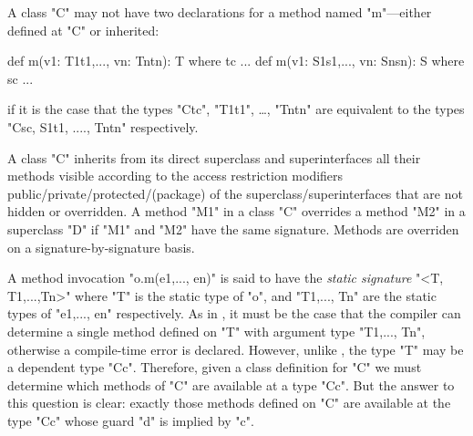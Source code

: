 \begin{staticrule*}
  A class \xcd"C" may not have two declarations for a method named \xcd"m"---either
  defined at \xcd"C" or inherited:
\begin{xten}
def m(v1: T1{t1},..., vn: Tn{tn}): T where tc {...}
def m(v1: S1{s1},..., vn: Sn{sn}): S where sc {...}
\end{xten}
\noindent
if it is the case that the types \xcd"C{tc}", \xcd"T1{t1}",
\dots, \xcd"Tn{tn}" are
equivalent to the types \xcd"C{sc}, S1{t1}, ...., Tn{tn}"
respectively.
\end{staticrule*}

A class \xcd"C" inherits from its direct superclass and superinterfaces all
their methods visible according to the access restriction modifiers
public/private/protected/(package) of the superclass/superinterfaces
that are not hidden or overridden. A method \xcd"M1" in a class \xcd"C" overrides
a method \xcd"M2" in a superclass \xcd"D" if \xcd"M1" and \xcd"M2" have the same signature.
Methods are overriden on a signature-by-signature basis.

A method invocation \xcd"o.m(e1,..., en)" is said to have the {\em static
signature} \xcd"<T, T1,...,Tn>" where \xcd"T" is the static type of \xcd"o", and
\xcd"T1,..., Tn" are the static types of \xcd"e1,..., en" respectively.  As in
\Java, it must be the case that the compiler can determine a single
method defined on \xcd"T" with argument type \xcd"T1,..., Tn", otherwise a
compile-time error is declared. However, unlike \Java, the \Xten{} type \xcd"T"
may be a dependent type \xcd"C{c}". Therefore, given a class definition for
\xcd"C" we must determine which methods of \xcd"C" are available at a type
\xcd"C{c}". But the answer to this question is clear: exactly those methods
defined on \xcd"C" are available at the type \xcd"C{c}"
whose guard \xcd"d" is implied by \xcd"c".


